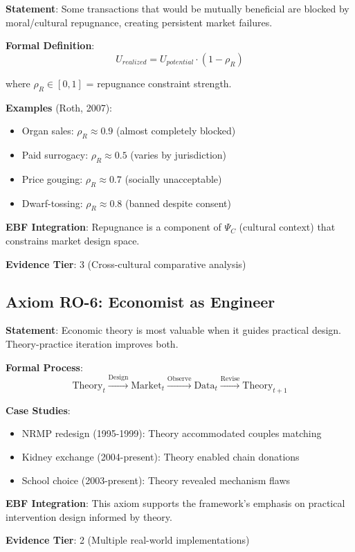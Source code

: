 \begin{tcolorbox}[colback=red!5!white,colframe=red!75!black,title=Axiom RO-5: Repugnance Constraint]
\textbf{Statement}: Some transactions that would be mutually beneficial are blocked by moral/cultural repugnance, creating persistent market failures.

\textbf{Formal Definition}:
\begin{equation}
U_{realized} = U_{potential} \cdot (1 - \rho_R)
\end{equation}

where $\rho_R \in [0,1]$ = repugnance constraint strength.

\textbf{Examples} (Roth, 2007):
\begin{itemize}
    \item Organ sales: $\rho_R \approx 0.9$ (almost completely blocked)
    \item Paid surrogacy: $\rho_R \approx 0.5$ (varies by jurisdiction)
    \item Price gouging: $\rho_R \approx 0.7$ (socially unacceptable)
    \item Dwarf-tossing: $\rho_R \approx 0.8$ (banned despite consent)
\end{itemize}

\textbf{EBF Integration}: Repugnance is a component of $\Psi_C$ (cultural context) that constrains market design space.

\textbf{Evidence Tier}: 3 (Cross-cultural comparative analysis)
\end{tcolorbox}

\subsection{Axiom RO-6: Economist as Engineer}

\begin{tcolorbox}[colback=green!5!white,colframe=green!75!black,title=Axiom RO-6: Economist as Engineer]
\textbf{Statement}: Economic theory is most valuable when it guides practical design. Theory-practice iteration improves both.

\textbf{Formal Process}:
\begin{equation}
\text{Theory}_t \xrightarrow{\text{Design}} \text{Market}_t \xrightarrow{\text{Observe}} \text{Data}_t \xrightarrow{\text{Revise}} \text{Theory}_{t+1}
\end{equation}

\textbf{Case Studies}:
\begin{itemize}
    \item NRMP redesign (1995-1999): Theory accommodated couples matching
    \item Kidney exchange (2004-present): Theory enabled chain donations
    \item School choice (2003-present): Theory revealed mechanism flaws
\end{itemize}

\textbf{EBF Integration}: This axiom supports the framework's emphasis on practical intervention design informed by theory.

\textbf{Evidence Tier}: 2 (Multiple real-world implementations)
\end{tcolorbox}

